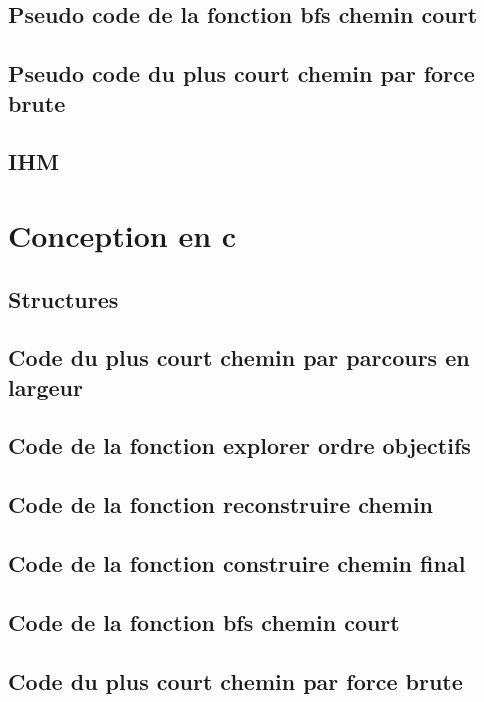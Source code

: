 \subsection{Pseudo code de la fonction bfs chemin court}

\subsection{Pseudo code du plus court chemin par force brute}

\subsection{IHM}


\section{Conception en c}
\subsection{Structures}

\subsection{Code du plus court chemin par parcours en largeur}

\subsection{Code de la fonction explorer ordre objectifs }

\subsection{Code de la fonction reconstruire chemin}

\subsection{Code de la fonction  construire chemin final}

\subsection{Code de la fonction bfs chemin court}

\subsection{Code du plus court chemin par force brute}

